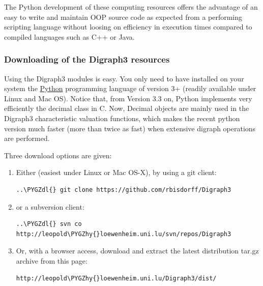 \documentclass[letterpaper,10pt,english]{sphinxmanual}
\def\PYGZdl{\char`\$}
\def\PYGZhy{\char`\-}
\begin{document}
The Python development of these computing resources offers the advantage of an easy to write and maintain OOP source code as expected from a performing scripting language without loosing on efficiency in execution times compared to compiled languages such as C++ or Java.


\subsubsection{Downloading of the Digraph3 resources}
\label{tutorial:downloading-of-the-digraph3-resources}
Using the Digraph3 modules is easy. You only need to have installed on your system the \href{https://www.python.org/doc/}{Python} programming language of version 3+ (readily available under Linux and Mac OS). Notice that, from Version 3.3 on, Python implements very efficiently the decimal class in C. Now, Decimal objects are mainly used in the Digraph3 characteristic valuation functions, which makes the recent python version much faster (more than twice as fast) when extensive digraph operations are performed.

Three download options are given:
\begin{enumerate}
\item {} 
Either (easiest under Linux or Mac OS-X), by using a git client:

\begin{Verbatim}[commandchars=\\\{\}]
..\PYGZdl{} git clone https://github.com/rbisdorff/Digraph3
\end{Verbatim}

\item {} 
or a subversion client:

\begin{Verbatim}[commandchars=\\\{\}]
..\PYGZdl{} svn co http://leopold\PYGZhy{}loewenheim.uni.lu/svn/repos/Digraph3
\end{Verbatim}

\item {} 
Or, with a browser access, download and extract the latest distribution tar.gz archive from this page:

\begin{Verbatim}[commandchars=\\\{\}]
http://leopold\PYGZhy{}loewenheim.uni.lu/Digraph3/dist/
\end{Verbatim}

\end{enumerate}
\end{document}
